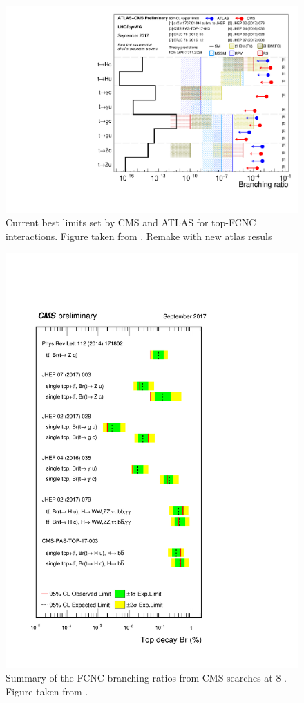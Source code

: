 \begin{figure}[htbp]
	\centering
	\includegraphics[width=0.7\linewidth]{1_Introduction/Figures/fcnc_summarybsm_sep17}
	\caption{Current best limits set by CMS and ATLAS for top-FCNC interactions.  Figure taken from \cite{summarywiki}. Remake with new atlas resuls}
	\label{fig:fcncupperlimits}
\end{figure}
\begin{figure}
	\centering
	\includegraphics[width=1.\linewidth]{1_Introduction/Figures/summary_FCNC}
	\caption{Summary of the FCNC branching ratios from CMS searches at 8 \TeV. Figure taken from \cite{summarywiki}.}
	\label{fig:summaryfcnc}
\end{figure}



